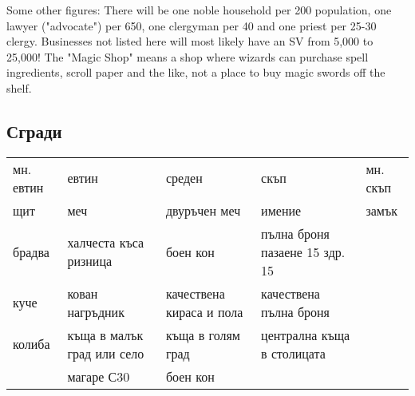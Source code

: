 Some other figures: There will be one noble household per 200 population, one lawyer ("advocate") per 650, one clergyman per 40 and one priest per 25-30 clergy. Businesses not listed here will most likely have an SV from 5,000 to 25,000! The "Magic Shop" means a shop where wizards can purchase spell ingredients, scroll paper and the like, not a place to buy magic swords off the shelf. 

\subsection{Сгради}
\begin{tabular}{p{3cm} | p{3cm} | p{3cm} | p{3cm} | p{3cm}}
мн. евтин & евтин                                   & среден                   & скъп                           & мн. скъп  \\
щит       & меч                                     & двуръчен меч             & имение                         & замък     \\
брадва    & халчеста къса ризница                   & боен кон                 & пълна броня пазаене 15 здр. 15 &           \\
куче      & кован нагръдник                         & качествена кираса и пола & качествена пълна броня         &           \\
колиба    & къща в малък град или село              & къща в голям град        & централна къща в столицата                 \\
          & магаре С30                              & боен кон                 &
\end{tabular}



